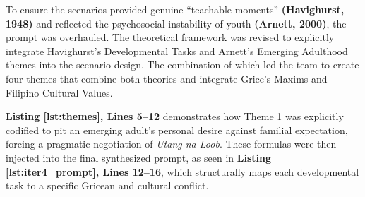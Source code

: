 To ensure the scenarios provided genuine ``teachable moments'' \textbf{(Havighurst, 1948)} and reflected the psychosocial instability of youth \textbf{(Arnett, 2000)}, the prompt was overhauled. The theoretical framework was revised to explicitly integrate Havighurst's Developmental Tasks and Arnett's Emerging Adulthood themes into the scenario design. The combination of which led the team to create four themes that combine both theories and integrate Grice's Maxims and Filipino Cultural Values.

\textbf{Listing \ref{lst:themes}, Lines 5--12} demonstrates how Theme 1 was explicitly codified to pit an emerging adult's personal desire against familial expectation, forcing a pragmatic negotiation of \textit{Utang na Loob}. These formulas were then injected into the final synthesized prompt, as seen in \textbf{Listing \ref{lst:iter4_prompt}, Lines 12--16}, which structurally maps each developmental task to a specific Gricean and cultural conflict.

